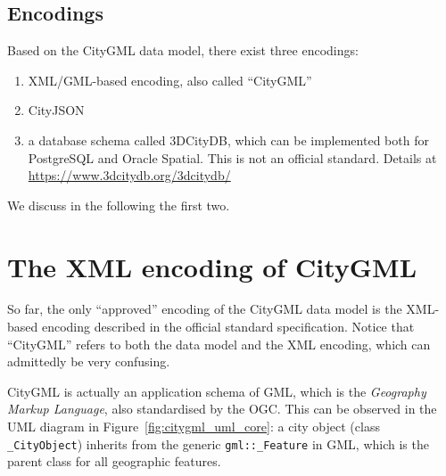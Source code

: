 



\subsection{Encodings}

Based on the CityGML data model, there exist three encodings:
\begin{enumerate}
  \item XML/GML-based encoding, also called ``CityGML''
  \item CityJSON
  \item a database schema called 3DCityDB, which can be implemented both for PostgreSQL and Oracle Spatial. This is not an official standard. Details at \url{https://www.3dcitydb.org/3dcitydb/}
\end{enumerate}
We discuss in the following the first two.


\section[XML-encoded CityGML]{The XML encoding of CityGML}%
\label{sec:citygmlxml}

So far, the only ``approved'' encoding of the CityGML data model is the XML-based encoding described in the official standard specification.
Notice that ``CityGML'' refers to both the data model and the XML encoding, which can admittedly be very confusing.

%

CityGML is actually an application schema of GML, which is the \emph{Geography Markup Language}, also standardised by the OGC.
This can be observed in the UML diagram in Figure~\ref{fig:citygml_uml_core}: a city object (class \texttt{\_CityObject}) inherits from the generic \texttt{gml::\_Feature} in GML, which is the parent class for all geographic features.
  
%

